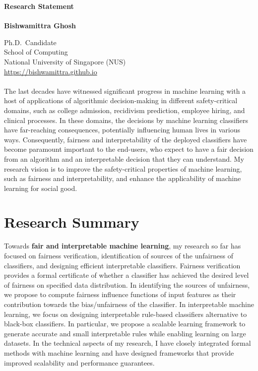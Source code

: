 \documentclass[10pt]{article}
\newcommand{\blue}[1]{\textcolor{blue}{#1}}
\begin{document}
	\noindent\huge \textbf{Research Statement} \\
	\vspace{0.1em}\\
	\Large \textbf{Bishwamittra Ghosh}
		
	\normalsize
	\noindent Ph.D.\ Candidate\\
	School of Computing\\
	National University of Singapore (NUS)\\
	\blue{\url{https://bishwamittra.github.io}}



	\paragraph{}
	The last decades have witnessed significant progress in machine learning with a host of applications of algorithmic decision-making in different safety-critical domains, such as college admission, recidivism prediction, employee hiring, and clinical processes. In these domains, the decisions by machine learning classifiers have far-reaching consequences, potentially influencing human lives in various ways. Consequently, fairness and interpretability of the deployed classifiers have become paramount important to the end-users, who expect to have a fair decision from an algorithm and an interpretable decision that they can understand. My research vision is to improve the safety-critical properties of machine learning, such as fairness and interpretability, and enhance the applicability of machine learning for social good. 
	
	\section*{Research Summary}
	
	Towards \textbf{fair and interpretable machine learning}, my research so far has focused on fairness verification, identification of sources of the unfairness of classifiers, and designing efficient interpretable classifiers. Fairness verification provides a formal certificate of whether a classifier has achieved the desired level of fairness on specified data distribution. In identifying the sources of unfairness, we propose to compute fairness influence functions of input features as their contribution towards the bias/unfairness of the classifier. In interpretable machine learning, we focus on designing interpretable rule-based classifiers alternative to black-box classifiers. In particular, we propose a scalable learning framework to generate accurate and small interpretable rules while enabling learning on large datasets. In the technical aspects of my research, I have closely integrated formal methods with machine learning and have designed frameworks that provide improved scalability and performance guarantees.
	
\end{document}
